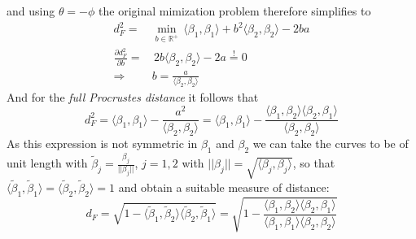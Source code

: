 and using $\theta = -\phi$ the original mimization problem therefore simplifies to
\begin{align*}
d_F^2 =& 
\min_{b \in \mathbb{R}^+}\,
  \langle \beta_1, \beta_1 \rangle 
  + b^2 \langle \beta_2, \beta_2 \rangle
  - 2 b a \\
\frac{\partial d_F^2}{\partial b} =& \,
  2 b \langle \beta_2, \beta_2 \rangle - 2a \stackrel{!}{=} 0 \\
\Rightarrow \quad & b = \frac{a}{\langle \beta_2, \beta_2 \rangle}
\end{align*}
And for the \textit{full Procrustes distance} it follows that
$$ d_F^2 
= \langle \beta_1, \beta_1 \rangle - \frac{a^2}{\langle \beta_2, \beta_2 \rangle}
= \langle \beta_1, \beta_1 \rangle - \frac{ \langle \beta_1, \beta_2 \rangle \langle \beta_2, \beta_1 \rangle}{\langle \beta_2, \beta_2 \rangle}$$
As this expression is not symmetric in $\beta_1$ and $\beta_2$ we can take the curves to be of unit length with $\tilde{\beta}_j = \frac{\beta_j}{||\beta_j||}$, $j=1,2$ with $||\beta_j|| = \sqrt{\langle \beta_j, \beta_j \rangle}$, so that $\langle \tilde\beta_1, \tilde\beta_1 \rangle = \langle \tilde\beta_2, \tilde\beta_2 \rangle = 1$ and obtain a suitable measure of distance:
$$ d_F = \sqrt{1 - \langle \tilde\beta_1, \tilde\beta_2 \rangle
                   \langle \tilde\beta_2, \tilde\beta_1 \rangle}
       = \sqrt{1 - \frac{ \langle \beta_1, \beta_2 \rangle \langle \beta_2, \beta_1 \rangle}{\langle \beta_1, \beta_1 \rangle \langle \beta_2, \beta_2 \rangle}}$$




